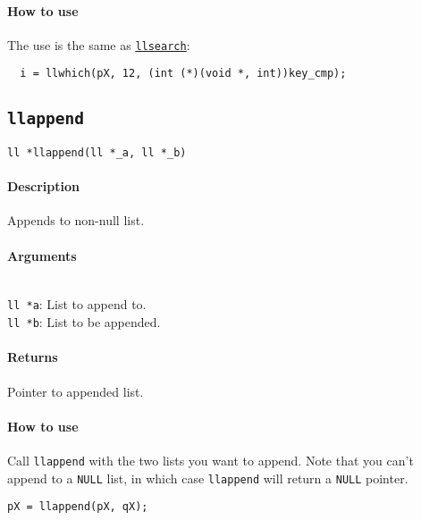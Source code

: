 \documentclass{article}
\begin{document}
\paragraph{How to use}

The use is the same as \hyperref[llsearch]{\texttt{llsearch}}:\\[8pt]
\begin{verbatim}
  i = llwhich(pX, 12, (int (*)(void *, int))key_cmp);
\end{verbatim}

\subsection{\texttt{llappend}}

\verb|ll *llappend(ll *_a, ll *_b)|

\paragraph{Description}
Appends to non-null list.

\paragraph{Arguments}
\verb| |\\
\verb|ll *a|: List to append to.\\
\verb|ll *b|: List to be appended.

\paragraph{Returns}
Pointer to appended list.

\paragraph{How to use}

Call \texttt{llappend} with the two lists you want to append. Note that you can't append to a
\texttt{NULL} list, in which case \texttt{llappend} will return a \texttt{NULL} pointer.\\[8pt]
\begin{verbatim}
pX = llappend(pX, qX);
\end{verbatim}

\vspace{5pt}


\\
\end{document}
